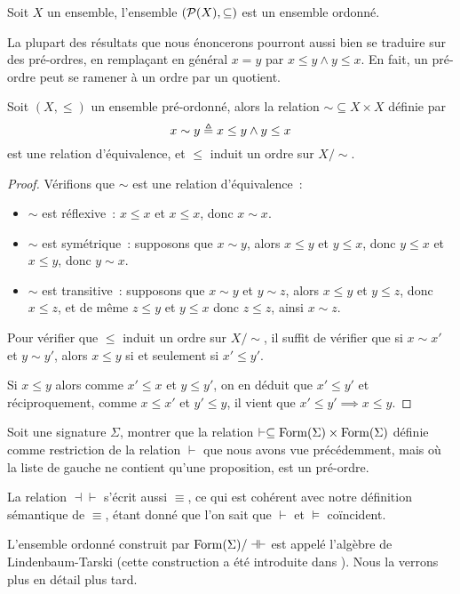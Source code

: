 \begin{example}
  Soit $X$ un ensemble, l'ensemble $(\mathcal{P}(X),\subseteq)$ est un ensemble
  ordonné.
\end{example}

La plupart des résultats que nous énoncerons pourront aussi bien se traduire sur
des pré-ordres, en remplaçant en général $x = y$ par $x\leq y \land y \leq x$.
En fait, un pré-ordre peut se ramener à un ordre par un quotient.

\begin{property}
  Soit $(X,\leq)$ un ensemble pré-ordonné, alors la relation
  $\sim\subseteq X \times X$ définie par
  \[x\sim y \triangleq x\leq y \land y \leq x\]
  est une relation d'équivalence, et $\leq$ induit un ordre sur $X/\sim$.
\end{property}

\begin{proof}
  Vérifions que $\sim$ est une relation d'équivalence~:
  \begin{itemize}
  \item $\sim$ est réflexive~: $x\leq x$ et $x\leq x$, donc $x\sim x$.
  \item $\sim$ est symétrique~: supposons que $x\sim y$, alors $x\leq y$ et
    $y\leq x$, donc $y\leq x$ et $x\leq y$, donc $y\sim x$.
  \item $\sim$ est transitive~: supposons que $x\sim y$ et $y\sim z$, alors
    $x\leq y$ et $y\leq z$, donc $x\leq z$, et de même $z\leq y$ et $y\leq x$
    donc $z\leq z$, ainsi $x\sim z$.
  \end{itemize}

  Pour vérifier que $\leq$ induit un ordre sur $X/\sim$, il suffit de vérifier
  que si $x\sim x'$ et $y\sim y'$, alors $x\leq y$ si et seulement si
  $x'\leq y'$.

  Si $x\leq y$ alors comme $x'\leq x$ et $y\leq y'$, on en déduit que
  $x'\leq y'$
  et réciproquement, comme $x\leq x'$ et $y'\leq y$, il vient que
  $x'\leq y'\implies x\leq y$.
\end{proof}

\begin{exercise}
  Soit une signature $\Sigma$, montrer que la relation
  $\vdash\subseteq\operatorname{Form}(\Sigma)\times\operatorname{Form}(\Sigma)$ définie comme
  restriction de la relation $\vdash$ que nous avons vue précédemment, mais où
  la liste de gauche ne contient qu'une proposition, est un pré-ordre.
\end{exercise}

\begin{remark}
  La relation $\dashv\vdash$ s'écrit aussi $\equiv$, ce qui est cohérent avec
  notre définition sémantique de $\equiv$, étant donné que l'on sait que
  $\vdash$ et $\vDash$ coïncident.

  L'ensemble ordonné construit par $\operatorname{Form}(\Sigma)/\dashv\vdash$ est appelé
  l'algèbre de Lindenbaum-Tarski (cette construction a été introduite dans
  \cite{LindenbaumTarski}). Nous la verrons plus en détail plus tard.
\end{remark}

